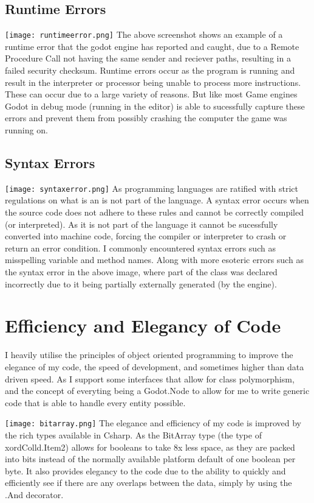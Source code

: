 \documentclass[12pt, DIV=calc]{scrartcl}
\begin{document}
\subsection{Runtime Errors}
\texttt{[image: runtimeerror.png]}
The above screenshot shows an example of a runtime error that the godot engine has reported and caught, due to a Remote Procedure Call not having the same sender and reciever paths, resulting in a failed security checksum. Runtime errors occur as the program is running and result in the interpreter or processor being unable to process more instructions. These can occur due to a large variety of reasons. But like most Game engines Godot in debug mode (running in the editor) is able to sucessfully capture these errors and prevent them from possibly crashing the computer the game was running on.

\subsection{Syntax Errors}
\texttt{[image: syntaxerror.png]}
As programming languages are ratified with strict regulations on what is an is not part of the language. A syntax error occurs when the source code does not adhere to these rules and cannot be correctly compiled (or interpreted). As it is not part of the language it cannot be sucessfully converted into machine code, forcing the compiler or interpreter to crash or return an error condition. I commonly encountered syntax errors such as misspelling variable and method names. Along with more esoteric errors such as the syntax error in the above image, where part of the class was declared incorrectly due to it being partially externally generated (by the engine). 






\clearpage
\section{Efficiency and Elegancy of Code}
I heavily utilise the principles of object oriented programming to improve the elegance of my code, the speed of development, and sometimes higher than data driven speed. As I support some interfaces that allow for class polymorphism, and the concept of everyting being a Godot.Node to allow for me to write generic code that is able to handle every entity possible. 

\texttt{[image: bitarray.png]}
The elegance and efficiency of my code is improved by the rich types available in Csharp. As the BitArray type (the type of xordColld.Item2) allows for booleans to take 8x less space, as they are packed into bits instead of the normally available platform default of one boolean per byte. It also provides elegancy to the code due to the ability to quickly and efficiently see if there are any overlaps between the data, simply by using the .And decorator.
\end{document}
